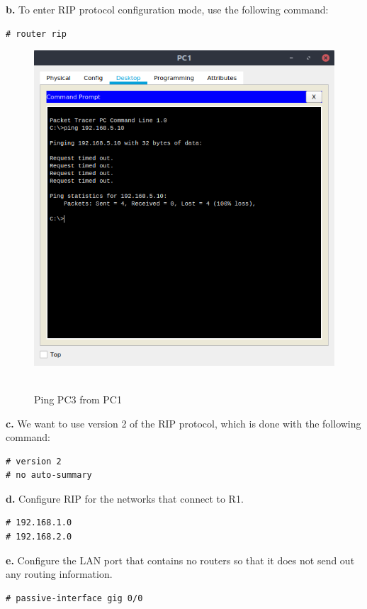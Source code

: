 \documentclass[conference]{IEEEtran}
\begin{document}
\textbf{b.} To enter RIP protocol configuration mode, use the following command:
\begin{verbatim}
# router rip
\end{verbatim}
\begin{center}
\begin{figure}[h]
\includegraphics[scale=0.45]{../q01b.png}\
\caption{Ping PC3 from PC1}
\end{figure}
\end{center}

\textbf{c.} We want to use version 2 of the RIP protocol, which is done with the following command:
\begin{verbatim}
# version 2
# no auto-summary
\end{verbatim}

\textbf{d.} Configure RIP for the networks that connect to R1.
\begin{verbatim}
# 192.168.1.0
# 192.168.2.0
\end{verbatim}

\textbf{e.} Configure the LAN port that contains no routers so that it does not send out any routing information.
\begin{verbatim}
# passive-interface gig 0/0
\end{verbatim}
\end{document}
